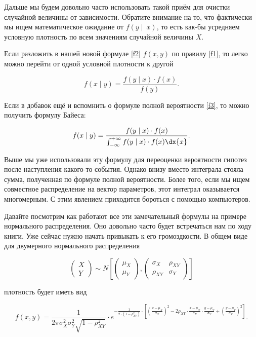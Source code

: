 \documentclass[12pt, a4paper, oneside]{article}
\begin{document}
Дальше мы будем довольно часто использовать такой приём для очистки случайной величины от зависимости. Обратите внимание на то, что фактически мы ищем математическое ожидание от $f(y\mid~x)$, то есть как-бы усредняем условную плотность по всем значениям случайной величины $X$.

Если разложить в нашей новой формуле \eqref{f2} $f(x,y)$ по правилу \eqref{f1}, то легко можно перейти от одной условной плотности к другой

\begin{equation}
f(x \mid y) = \frac{ f(y \mid x) \cdot f(x)}{f(y)}.
\end{equation}

Если в добавок ещё и вспомнить о формуле полной вероятности \eqref{f3}, то можно получить формулу Байеса:

\[ f(x \mid y) = \frac{ f(y \mid x) \cdot f(x)}{\int_{-\infty}^{+\infty} f(y \mid x) \cdot f(x) \dx{x}}. \]

Выше мы уже использовали эту формулу для переоценки вероятности гипотез после наступления какого-то события. Однако внизу вместо интеграла стояла сумма, полученная по формуле полной вероятности.  Более того, если мы ищем совместное распределение на вектор параметров, этот интеграл оказывается многомерным. С этим явлением приходится бороться с помощью компьютеров.  

Давайте посмотрим как работают все эти замечательный формулы на примере нормального распределения. Оно довольно часто будет встречаться нам по ходу книги. Уже сейчас нужно начать привыкать к его громоздкости.  В общем виде для двумерного нормального распределения

\[ 
\begin{pmatrix}
X \\
Y
\end{pmatrix} \sim N \left[ 
\begin{pmatrix}
\mu_X \\
\mu_Y
\end{pmatrix} ,
\begin{pmatrix}
\sigma_X & \rho_{XY} \\
 \rho_{XY}  & \sigma_Y
\end{pmatrix} 
\right]
\]

плотность будет иметь вид

\[
f(x,y) = \frac{1}{2 \pi \sigma_X^2 \sigma_Y^2  \sqrt{1 - \rho_{XY}^2}} \cdot e^{-\frac{1}{2 \cdot (1 - \rho^2_{XY})} \cdot \left[ \left(  \frac{x - \mu_X}{\sigma_X}  \right)^2 - 2 \rho_{XY} \cdot \frac{x - \mu_X}{\sigma_X} \cdot \frac{y - \mu_Y}{\sigma_Y} + \left( \frac{y - \mu_Y}{\sigma_Y}    \right)^2   \right]}.
\]
\end{document}
